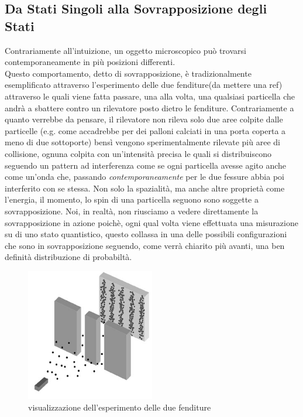 \documentclass[12pt,a4paper,openright]{report}
\begin{document}
\subsection{Da Stati Singoli alla Sovrapposizione degli Stati}
  Contrariamente all'intuizione, un oggetto microscopico può trovarsi contemporaneamente in più posizioni differenti.\\
  Questo comportamento, detto di sovrapposizione, è tradizionalmente esemplificato attraverso l'esperimento delle due fenditure(da mettere una ref) attraverso le quali viene 
  fatta passare, una alla volta, una qualsiasi particella che andrà a sbattere contro un rilevatore posto dietro le fenditure. Contrariamente a quanto verrebbe da pensare,
  il rilevatore non rileva solo due aree colpite dalle particelle (e.g. come accadrebbe per dei palloni calciati in una porta coperta a meno di due sottoporte) bensì vengono 
  sperimentalmente rilevate più aree di collisione, ognuna colpita con un'intensità precisa le quali si distribuiscono seguendo un pattern ad interferenza
  come se ogni particella avesse agito anche come un'onda che, passando \emph{contemporaneamente} per le due fessure abbia poi interferito con se stessa. 
  Non solo la spazialità, ma anche altre proprietà come l'energia, il momento, lo spin di una particella seguono sono soggette a sovrapposizione.
  Noi, in realtà, non riusciamo a vedere direttamente la sovrapposizione in azione poichè, ogni qual volta viene effettuata una misurazione su di uno
  stato quantistico, questo collassa in una delle possibili configurazioni che sono in sovrapposizione seguendo, come verrà chiarito più avanti, una ben definità distribuzione di probabiltà.
\begin{figure}
    \centering
    \includegraphics[width=0.5\textwidth]{double-slit-electrons1}
    \caption{visualizzazione dell'esperimento delle due fenditure}
\end{figure}
  
\end{document}
